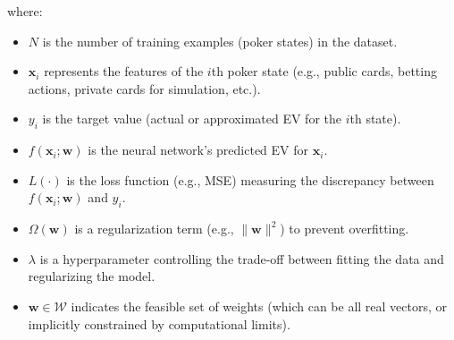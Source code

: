 \documentclass[12pt]{article}
\begin{document}
where:
\begin{itemize}
    \item $N$ is the number of training examples (poker states) in the dataset.
    \item $\mathbf{x}_i$ represents the features of the $i$th poker state (e.g., public cards, betting actions, private cards for simulation, etc.).
    \item $y_i$ is the target value (actual or approximated EV for the $i$th state).
    \item $f(\mathbf{x}_i; \mathbf{w})$ is the neural network’s predicted EV for $\mathbf{x}_i$.
    \item $L(\cdot)$ is the loss function (e.g., MSE) measuring the discrepancy between $f(\mathbf{x}_i; \mathbf{w})$ and $y_i$.
    \item $\Omega(\mathbf{w})$ is a regularization term (e.g., $\|\mathbf{w}\|^2$) to prevent overfitting.
    \item $\lambda$ is a hyperparameter controlling the trade-off between fitting the data and regularizing the model.
    \item $\mathbf{w} \in \mathcal{W}$ indicates the feasible set of weights (which can be all real vectors, or implicitly constrained by computational limits).
\end{itemize}
\end{document}
